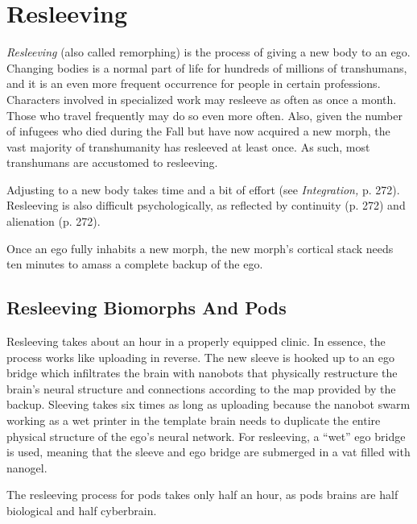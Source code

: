 \section{Resleeving}

\textit{Resleeving} (also called remorphing) is the process 
of giving a new body to an ego. Changing bodies 
is a normal part of life for hundreds of millions of 
transhumans, and it is an even more frequent occurrence
for people in certain professions. Characters
involved in specialized work may resleeve as often as 
once a month. Those who travel frequently may do so 
even more often. Also, given the number of infugees 
who died during the Fall but have now acquired a 
new morph, the vast majority of transhumanity has 
resleeved at least once. As such, most transhumans are 
accustomed to resleeving.

Adjusting to a new body takes time and a bit of 
effort (see \textit{Integration,} p. 272). Resleeving is also difficult
psychologically, as reflected by continuity (p. 272)
and alienation (p. 272).

Once an ego fully inhabits a new morph, the new 
morph's cortical stack needs ten minutes to amass a 
complete backup of the ego.

\subsection{Resleeving Biomorphs And Pods}

Resleeving takes about an hour in a properly equipped 
clinic. In essence, the process works like uploading in 
reverse. The new sleeve is hooked up to an ego bridge 
which infiltrates the brain with nanobots that physically
restructure the brain's neural structure and connections
according to the map provided by the backup.
Sleeving takes six times as long as uploading because 
the nanobot swarm working as a wet printer in the 
template brain needs to duplicate the entire physical 
structure of the ego's neural network. For resleeving, a 
``wet'' ego bridge is used, meaning that the sleeve and 
ego bridge are submerged in a vat filled with nanogel.

The resleeving process for pods takes only half an hour, 
as pods brains are half biological and half cyberbrain.

